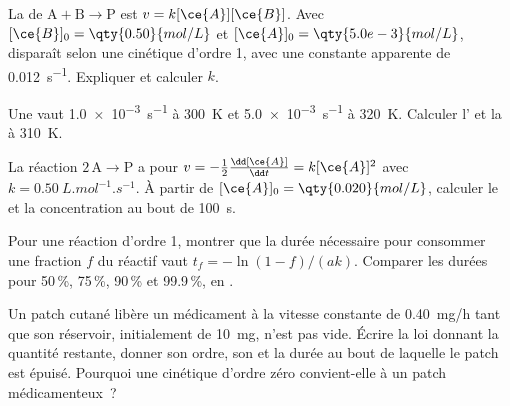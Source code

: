 \begin{exercise}[$\star\star$]\label{exo:b1:rate-laws:7}
La  de $\mathrm{A} + \mathrm{B} \longrightarrow \mathrm{P}$
est $v = k[\ce{A}][\ce{B}]$. Avec
$[\ce{B}]_0 = \qty{0.50}{mol/L}$ et $[\ce{A}]_0 = \qty{5.0e-3}{mol/L}$,
 disparaît selon une cinétique d'ordre 1, avec une constante
apparente de \qty{0.012}{s^{-1}}. Expliquer et calculer $k$.
\end{exercise}

\begin{exercise}[$\star\star$]\label{exo:b1:rate-laws:8}
Une  vaut \qty{1.0e-3}{s^{-1}} à \qty{300}{K} et
\qty{5.0e-3}{s^{-1}} à \qty{320}{K}. Calculer l' et
la  à \qty{310}{K}.
\end{exercise}

\begin{exercise}[$\star\star$]\label{exo:b1:rate-laws:9}
La réaction $2\,\mathrm{A} \longrightarrow \mathrm{P}$ a pour  $v = -\frac12\frac{\dd[\ce{A}]}
{\dd t} = k[\ce{A}]^2$ avec $k = \qty{0.50}{L.mol^{-1}.s^{-1}}$. À
partir de $[\ce{A}]_0 = \qty{0.020}{mol/L}$, calculer le  et la concentration au bout de \qty{100}{s}.
\end{exercise}

\begin{exercise}[$\star\star\star$]\label{exo:b1:rate-laws:10}
Pour une réaction d'ordre 1, montrer que la durée nécessaire pour
consommer une fraction $f$ du réactif vaut $t_f = -\ln(1 - f)/(ak)$.
Comparer les durées pour 50\,\%, 75\,\%, 90\,\% et 99.9\,\%, en .
\end{exercise}

\begin{exercise}[$\star\star\star$]\label{exo:b1:rate-laws:11}
Un patch cutané libère un médicament à la vitesse constante de
\qty{0.40}{mg/h} tant que son réservoir, initialement de \qty{10}{mg},
n'est pas vide. Écrire la loi donnant la quantité restante, donner son
ordre, son  et la durée au bout de laquelle le
patch est épuisé. Pourquoi une cinétique d'ordre zéro convient-elle à un
patch médicamenteux~?
\end{exercise}

